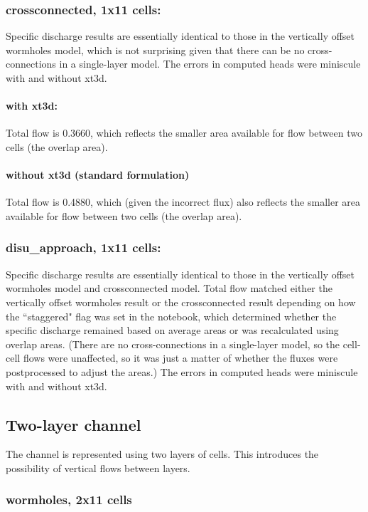 \documentclass{article}
\begin{document}
\subsubsection{crossconnected, 1x11 cells:} Specific discharge results are essentially identical to those in the vertically offset wormholes model, which is not surprising given that there can be no cross-connections in a single-layer model. The errors in computed heads were miniscule with and without xt3d.

\paragraph{with xt3d:} Total flow is 0.3660, which reflects the smaller area available for flow between two cells (the overlap area).

\paragraph{without xt3d (standard formulation)} Total flow is 0.4880, which (given the incorrect flux) also reflects the smaller area available for flow between two cells (the overlap area).

\subsubsection{disu\_approach, 1x11 cells:} Specific discharge results are essentially identical to those in the vertically offset wormholes model and crossconnected model. Total flow matched either the vertically offset wormholes result or the crossconnected result depending on how the ``staggered" flag was set in the notebook, which determined whether the specific discharge remained based on average areas or was recalculated using overlap areas. (There are no cross-connections in a single-layer model, so the cell-cell flows were unaffected, so it was just a matter of whether the fluxes were postprocessed to adjust the areas.) The errors in computed heads were miniscule with and without xt3d.

\subsection{Two-layer channel}
The channel is represented using two layers of cells. This introduces the possibility of vertical flows between layers.

\subsubsection{wormholes, 2x11 cells}
\end{document}
